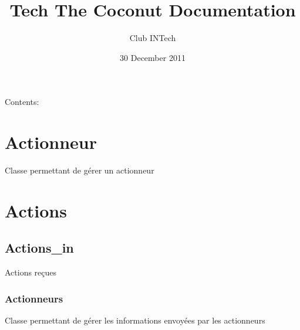 \documentclass[letterpaper,10pt,french]{sphinxmanual}
\title{Tech The Coconut Documentation}
\date{30 December 2011}
\author{Club INTech}
\begin{document}
\maketitle
\tableofcontents
{}\label{index::doc}


Contents:


\chapter{Actionneur}
\label{actionneur:actionneur}\label{actionneur::doc}\label{actionneur:welcome-to-tech-the-coconut-s-documentation}\label{actionneur:module-lib.actionneur}

\begin{fulllineitems}
\label{actionneur:lib.actionneur.Actionneur}
Classe permettant de gérer un actionneur

\end{fulllineitems}



\chapter{Actions}
\label{actions::doc}\label{actions:actions}

\section{Actions\_in}
\label{actions:actions-in}
Actions reçues


\subsection{Actionneurs}
\label{actions:actionneurs}\label{actions:module-lib.actions_in.actionneurs_in}

\begin{fulllineitems}
\label{actions:lib.actions_in.actionneurs_in.Actionneurs_in}
Classe permettant de gérer les informations envoyées par les actionneurs

\end{fulllineitems}
\end{document}
